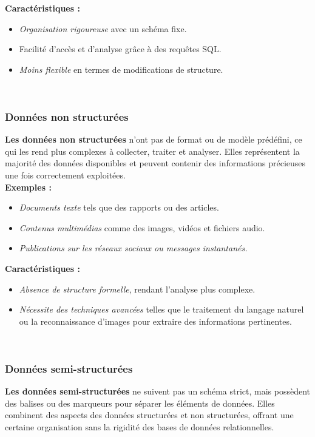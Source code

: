 \documentclass[a4paper,12pt]{article}
\begin{document}
            \textbf{Caractéristiques :}
            \begin{itemize}
                \item \textit{Organisation rigoureuse} avec un schéma fixe.
                \item Facilité d'accès et d'analyse grâce à des requêtes SQL.
                \item \textit{Moins flexible} en termes de modifications de structure.
            \end{itemize}\\


        \subsubsection{Données non structurées}
            \textbf{Les données non structurées} n'ont pas de format ou de modèle prédéfini, ce qui les rend plus complexes à collecter, traiter et analyser. Elles représentent la majorité des données disponibles et peuvent contenir des informations précieuses une fois correctement exploitées.\\

            \textbf{Exemples :}
            \begin{itemize}
                \item \textit{Documents texte} tels que des rapports ou des articles.
                \item \textit{Contenus multimédias} comme des images, vidéos et fichiers audio.
                \item \textit{Publications sur les réseaux sociaux ou messages instantanés.}
            \end{itemize}
            
            \textbf{Caractéristiques :}
            \begin{itemize}
                \item \textit{Absence de structure formelle}, rendant l'analyse plus complexe.
                \item \textit{Nécessite des techniques avancées} telles que le traitement du langage naturel ou la reconnaissance d'images pour extraire des informations pertinentes.
            \end{itemize}\\

        \subsubsection{Données semi-structurées}
            \textbf{Les données semi-structurées} ne suivent pas un schéma strict, mais possèdent des balises ou des marqueurs pour séparer les éléments de données. Elles combinent des aspects des données structurées et non structurées, offrant une certaine organisation sans la rigidité des bases de données relationnelles.\\
\end{document}
